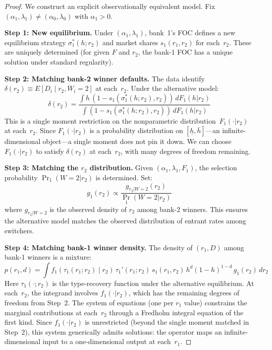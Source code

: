 \documentclass[12pt]{article}
\theoremstyle{plain}
\theoremstyle{plain}
\theoremstyle{definition}  %
\theoremstyle{remark}  %
\begin{document}
\begin{proof}
We construct an explicit observationally equivalent model.  Fix $(\alpha_1, \lambda_1) \neq (\alpha_0, \lambda_0)$ with $\alpha_1 > 0$.

\medskip\noindent
\textbf{Step 1: New equilibrium.}  Under $(\alpha_1, \lambda_1)$, bank~1's FOC defines a new equilibrium strategy $\sigma_1^*(h; r_2)$ and market shares $s_1(r_1, r_2)$ for each~$r_2$.  These are uniquely determined (for given $F$ and $r_2$, the bank-1 FOC has a unique solution under standard regularity).

\medskip\noindent
\textbf{Step 2: Matching bank-2 winner defaults.}  The data identify $\delta(r_2) \equiv E[D_i \mid r_2, W_i = 2]$ at each~$r_2$.  Under the alternative model:
\[
    \delta(r_2) = \frac{\int h\,(1 - s_1(\sigma_1^*(h; r_2), r_2))\, dF_1(h|r_2)}{\int (1 - s_1(\sigma_1^*(h; r_2), r_2))\, dF_1(h|r_2)}
\]
This is a single moment restriction on the nonparametric distribution~$F_1(\cdot|r_2)$ at each~$r_2$.  Since $F_1(\cdot|r_2)$ is a probability distribution on $[\underline{h}, \bar{h}]$---an infinite-dimensional object---a single moment does not pin it down.  We can choose $F_1(\cdot|r_2)$ to satisfy $\delta(r_2)$ at each~$r_2$, with many degrees of freedom remaining.

\medskip\noindent
\textbf{Step 3: Matching the $r_2$ distribution.}  Given $(\alpha_1, \lambda_1, F_1)$, the selection probability $\Pr_1(W\!=\!2|r_2)$ is determined.  Set:
\[
    g_1(r_2) \propto \frac{g_{r_2|W=2}(r_2)}{\Pr_1(W\!=\!2|r_2)}
\]
where $g_{r_2|W=2}$ is the observed density of $r_2$ among bank-2 winners.  This ensures the alternative model matches the observed distribution of entrant rates among switchers.

\medskip\noindent
\textbf{Step 4: Matching bank-1 winner density.}  The density of $(r_1, D)$ among bank-1 winners is a mixture:
\[
    p(r_1, d) = \int f_1(\tau_1(r_1; r_2) \mid r_2)\, \tau_1'(r_1; r_2)\, s_1(r_1, r_2)\, h^d(1\!-\!h)^{1-d}\, g_1(r_2)\, dr_2
\]
Here $\tau_1(\cdot; r_2)$ is the type-recovery function under the alternative equilibrium.  At each~$r_2$, the integrand involves $f_1(\cdot|r_2)$, which has the remaining degrees of freedom from Step~2.  The system of equations (one per $r_1$ value) constrains the marginal contributions at each~$r_2$ through a Fredholm integral equation of the first kind.  Since $f_1(\cdot|r_2)$ is unrestricted (beyond the single moment matched in Step~2), this system generically admits solutions: the operator maps an infinite-dimensional input to a one-dimensional output at each~$r_1$.


\end{proof}
\end{document}

